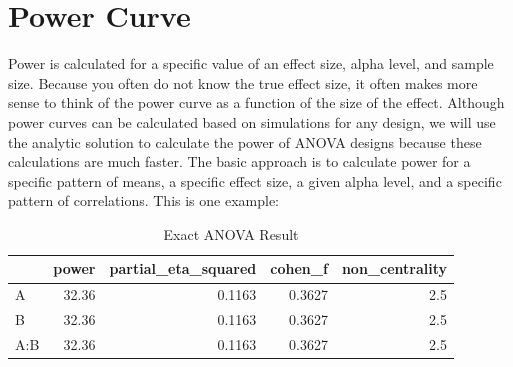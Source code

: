 \documentclass[]{book}
\newenvironment{Shaded}{\begin{snugshade}}{\end{snugshade}}
\newcommand{\CommentTok}[1]{\textcolor[rgb]{0.56,0.35,0.01}{\textit{#1}}}
\newcommand{\DataTypeTok}[1]{\textcolor[rgb]{0.13,0.29,0.53}{#1}}
\newcommand{\DecValTok}[1]{\textcolor[rgb]{0.00,0.00,0.81}{#1}}
\newcommand{\FloatTok}[1]{\textcolor[rgb]{0.00,0.00,0.81}{#1}}
\newcommand{\KeywordTok}[1]{\textcolor[rgb]{0.13,0.29,0.53}{\textbf{#1}}}
\newcommand{\NormalTok}[1]{#1}
\newcommand{\OtherTok}[1]{\textcolor[rgb]{0.56,0.35,0.01}{#1}}
\newcommand{\StringTok}[1]{\textcolor[rgb]{0.31,0.60,0.02}{#1}}
\begin{document}
\hypertarget{power-curve}{%
\chapter{Power Curve}\label{power-curve}}

Power is calculated for a specific value of an effect size, alpha level, and sample size. Because you often do not know the true effect size, it often makes more sense to think of the power curve as a function of the size of the effect. Although power curves can be calculated based on simulations for any design, we will use the analytic solution to calculate the power of ANOVA designs because these calculations are much faster. The basic approach is to calculate power for a specific pattern of means, a specific effect size, a given alpha level, and a specific pattern of correlations. This is one example:

\begin{Shaded}
\end{Shaded}

\begin{table}[t]

\caption{\label{tab:unnamed-chunk-215}Exact ANOVA Result}
\centering
\begin{tabular}{l|r|r|r|r}
\hline
  & power & partial\_eta\_squared & cohen\_f & non\_centrality\\
\hline
A & 32.36 & 0.1163 & 0.3627 & 2.5\\
\hline
B & 32.36 & 0.1163 & 0.3627 & 2.5\\
\hline
A:B & 32.36 & 0.1163 & 0.3627 & 2.5\\
\hline
\end{tabular}
\end{table}
\end{document}
